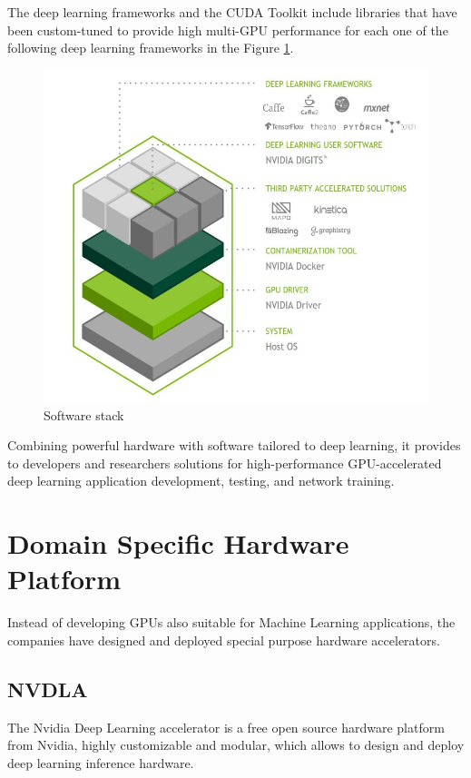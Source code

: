 \newpage
The deep learning frameworks and the CUDA Toolkit include libraries that have been custom-tuned to provide high multi-GPU performance for each one of the following deep learning frameworks in the Figure \ref{fig:swtesla}.

\begin{figure}[!htbp]
\centering
\captionsetup{justification=centering}
\includegraphics[scale=0.6]{./figure/sw_stack_tesla.PNG}
\caption{Software stack\cite{paper:41}}
\label{fig:swtesla}
\end{figure}

Combining powerful hardware with software tailored to deep learning, it provides to developers and researchers solutions for high-performance GPU-accelerated deep learning application development, testing, and network training.
\newpage
\section{Domain Specific Hardware Platform}
Instead of developing GPUs also suitable for Machine Learning applications, the companies have designed and deployed special purpose hardware accelerators.
\subsection{NVDLA}
The Nvidia Deep Learning accelerator is a free open source hardware platform from Nvidia, highly customizable and modular, which allows to design and deploy deep learning inference hardware.

